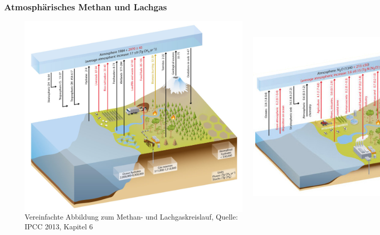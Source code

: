\begin{frame}
	\frametitle{Atmosphärisches Methan und Lachgas}	
	\begin{figure}
		\begin{columns}
				\includegraphics[width=\linewidth]{bilder/IPCC_Cycles_methane.jpg}
			
				\includegraphics[width=1.1\linewidth]{bilder/IPCC_Cycles_n2o_.jpg}
		\end{columns}
		\caption{Vereinfachte Abbildung zum Methan- und Lachgaskreislauf, Quelle: IPCC 2013, Kapitel 6}
	\end{figure}


\end{frame}

